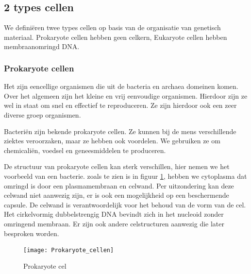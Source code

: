 \documentclass[a4paper,kul]{kulakarticle} %
\begin{document}
\newpage
\newpage
\subsection{2 types cellen}
We definiëren twee types cellen op basis van de organisatie van genetisch materiaal. Prokaryote cellen hebben geen celkern, Eukaryote cellen hebben membraanomringd DNA.  
\subsubsection{Prokaryote cellen}
Het zijn eencellige organismen die uit de bacteria en archaea domeinen komen. Over het algemeen zijn het kleine en vrij eenvoudige organismen. Hierdoor zijn ze wel in staat om snel en effectief te reproduceren. Ze zijn hierdoor ook een zeer diverse groep organismen. 

Bacteriën zijn bekende prokaryote cellen. Ze kunnen bij de mens verschillende ziektes veroorzaken, maar ze hebben ook voordelen. We gebruiken ze om chemicaliën, voedsel en geneesmiddelen te produceren. 

De structuur van prokaryote cellen kan sterk verschillen, hier nemen we het voorbeeld van een bacterie. zoals te zien is in figuur \ref{fig:prokaryotecellen}, hebben we cytoplasma dat omringd is door een plasmamembraan en celwand. Per uitzondering kan deze celwand niet aanwezig zijn, er is ook een mogelijkheid op een beschermende capsule. De celwand is verantwoordelijk voor het behoud van de vorm van de cel.  Het cirkelvormig dubbelstrengig DNA bevindt zich in het nucleoid zonder omringend membraan. Er zijn ook andere celstructuren aanwezig die later besproken worden. 

\begin{figure}[h]
	\centering
	\texttt{[image: Prokaryote\_cellen]}
	\caption[Prokaryote cel]{Prokaryote cel}
	\label{fig:prokaryotecellen}
\end{figure}
\newpage
\end{document}
